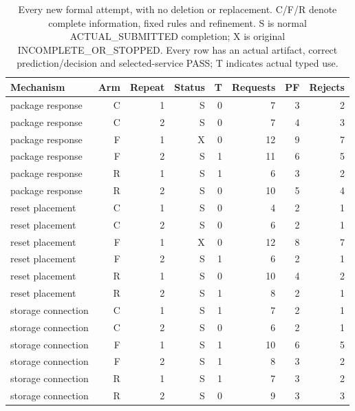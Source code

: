 \begin{table}[tbp]
\centering\small
\setlength{\tabcolsep}{4.5pt}
\caption{Every new formal attempt, with no deletion or replacement. C/F/R denote complete information, fixed rules and refinement. S is normal ACTUAL\_SUBMITTED completion; X is original INCOMPLETE\_OR\_STOPPED. Every row has an actual artifact, correct prediction/decision and selected-service PASS; T indicates actual typed use.}
\label{tab:abc-attempts}
\begin{tabular}{lrrrrrrr}
\toprule
Mechanism & Arm & Repeat & Status & T & Requests & PF & Rejects \\
\midrule
package response & C & 1 & S & 0 & 7 & 3 & 2 \\
package response & C & 2 & S & 0 & 7 & 4 & 3 \\
package response & F & 1 & X & 0 & 12 & 9 & 7 \\
package response & F & 2 & S & 1 & 11 & 6 & 5 \\
package response & R & 1 & S & 1 & 6 & 3 & 2 \\
package response & R & 2 & S & 0 & 10 & 5 & 4 \\
reset placement & C & 1 & S & 0 & 4 & 2 & 1 \\
reset placement & C & 2 & S & 0 & 6 & 2 & 1 \\
reset placement & F & 1 & X & 0 & 12 & 8 & 7 \\
reset placement & F & 2 & S & 1 & 6 & 2 & 1 \\
reset placement & R & 1 & S & 0 & 10 & 4 & 2 \\
reset placement & R & 2 & S & 1 & 8 & 2 & 1 \\
storage connection & C & 1 & S & 1 & 7 & 2 & 1 \\
storage connection & C & 2 & S & 0 & 6 & 2 & 1 \\
storage connection & F & 1 & S & 1 & 10 & 6 & 5 \\
storage connection & F & 2 & S & 1 & 8 & 3 & 2 \\
storage connection & R & 1 & S & 1 & 7 & 3 & 2 \\
storage connection & R & 2 & S & 0 & 9 & 3 & 3 \\
\bottomrule
\end{tabular}
\end{table}
